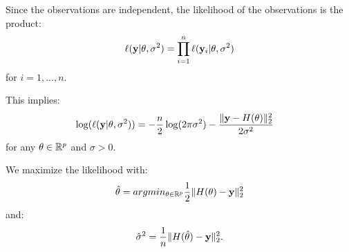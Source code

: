 \documentclass{beamer}
\begin{document}

\begin{frame}
Since the observations are independent, the likelihood of the observations is 
the product:
$$
\ell({\bf y}|{\bf \theta},\sigma^2) = 
\prod_{i=1}^n \ell({\bf y}_i|{\bf \theta},\sigma^2)
$$
for $i=1,...,n$. 

This implies:
\begin{align*}
\log(\ell({\bf y}|{\bf \theta},\sigma^2)) 
&= -\frac{n}{2} \log(2\pi \sigma^2)
-\frac{\|{\bf y}-H({\bf \theta})\|_2^2}{2 \sigma^2}
\end{align*}
for any ${\bf \theta}\in\mathbb{R}^p$ and $\sigma>0$. 

We maximize the likelihood with:
\begin{align*}
\hat{{\bf \theta}}
= arg min_{{\bf \theta}\in\mathbb{R}^p} \frac{1}{2} \| H({\bf \theta}) - {\bf y}\|_2^2
\end{align*}
and:
\begin{align*}
\hat{\sigma}^2
= \frac{1}{n} \| H(\hat{{\bf \theta}}) - {\bf y}\|_2^2.
\end{align*}

\end{frame}
\end{document}
